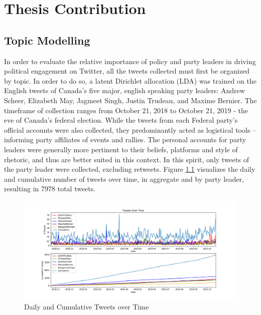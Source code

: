\chapter{Thesis Contribution}\label{ch:ThesisCont}
      
\section{Topic Modelling}\label{sec:TopicModelling}

In order to evaluate the relative importance of policy and party leaders in
driving political engagement on Twitter, all the tweets collected must first be
organized by topic. In order to do so, a latent Dirichlet allocation (LDA) was
trained on the English tweets of Canada's five major, english speaking party
leaders: Andrew Scheer, Elizabeth May, Jagmeet Singh, Justin Trudeau, and Maxime
Bernier. The timeframe of collection ranges from October 21, 2018 to October 21,
2019 - the eve of Canada's federal election. While the tweets from each Federal
party's official accounts were also collected, they predominantly acted as
logistical tools -- informing party affiliates of events and rallies. The
personal accounts for party leaders were generally more pertinent to their
beliefs, platforms and style of rhetoric, and thus are better suited in this
context. In this spirit, only tweets of the party leader were collected,
excluding retweets. Figure \ref{fig:tweets_over_time} visualizes the daily and
cumulative number of tweets over time, in aggregate and by party leader,
resulting in 7978 total tweets.

\begin{singlespacing}
    \begin{figure}[H]
    \centering
    \includegraphics[scale=0.40]{Figures/tweets_over_time}
    \caption[Daily and Cumulative Tweets over Time]{Daily and Cumulative Tweets over Time}
    \label{fig:tweets_over_time}
    \end{figure}
\end{singlespacing}

